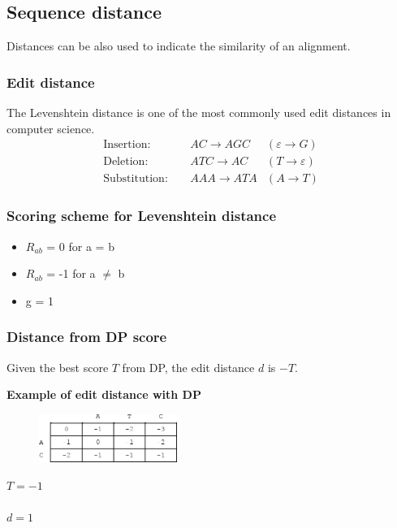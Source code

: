 %
%

%
%
\subsection{Sequence distance}
Distances can be also used to indicate the similarity of an alignment.

%
%
\subsubsection*{Edit distance}
The Levenshtein distance is one of the most commonly used edit distances in computer science.
\begin{align*}
\mathrm{Insertion}: & \quad AC  \rightarrow AGC  & (\varepsilon  \rightarrow G) \\
\mathrm{Deletion}: & \quad ATC \rightarrow AC & (T \rightarrow \varepsilon) \\
\mathrm{Substitution}: & \quad AAA \rightarrow ATA &  (A \rightarrow T) 
\end{align*}

%
%
\subsubsection*{Scoring scheme for Levenshtein distance}
\begin{itemize}
\item $R_{ab}$ = 0 for a = b
\item $R_{ab}$ = -1 for a $\neq$ b
\item g = 1
\end{itemize}

%
%
\subsubsection*{Distance from DP score}
Given the best score $T$ from DP, the edit distance $d$ is $-T$.
\bigskip  

\noindent
\textbf{Example of edit distance with DP}
\begin{multicols}{2}
\begin{figure}[H]
  \centering
      \includegraphics[width=0.4\textwidth]{fig03/dp_for_edit_distance.png}
\end{figure}
\vfill\null
\columnbreak

\vfill\null
\noindent $T = -1$ \\\\
\noindent $d = 1$

\end{multicols} 

